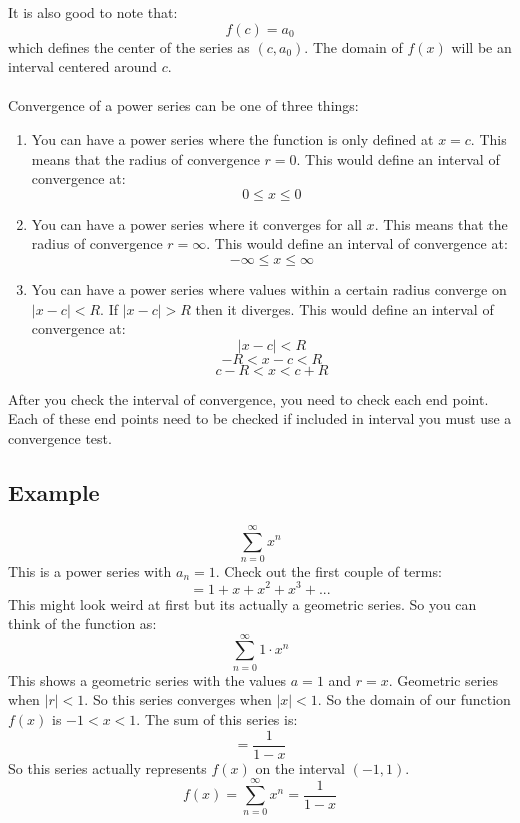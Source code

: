 \documentclass{article}
\begin{document}
    It is also good to note that:
    \[f(c) = a_0\]
    which defines the center of the series as \((c, a_0)\).
    The domain of \(f(x)\) will be an interval centered around \(c\).\\
    \\
    Convergence of a power series can be one of three things:
    \begin{enumerate}
        \item You can have a power series where the function is only defined at \(x = c\).
        This means that the radius of convergence \(r = 0\).
        This would define an interval of convergence at:
        \[0 \leq x \leq 0\]
        \item You can have a power series where it converges for all \(x\).
        This means that the radius of convergence \(r = \infty\).
        This would define an interval of convergence at:
        \[- \infty \leq x \leq \infty\]
        \item You can have a power series where values within a certain radius converge on
        \(|x-c| < R\).
        If \(|x-c| > R\) then it diverges.
        This would define an interval of convergence at:
        \[|x-c| < R\]
        \[-R < x - c < R\]
        \[c - R < x < c + R\]
    \end{enumerate}
    After you check the interval of convergence, you need to check each end point.
    Each of these end points need to be checked if included in interval you must use a convergence test.
    
    \subsection{Example}
        \[\sum_{n=0}^{\infty} x^n \]
        This is a power series with \(a_n = 1\).
        Check out the first couple of terms:
        \[= 1 + x + x^2 + x^3 + ...\]
        This might look weird at first but its actually a geometric series.
        So you can think of the function as:
        \[\sum_{n=0}^{\infty} 1 \cdot x^n\]
        This shows a geometric series with the values \(a = 1\) and \(r = x\).
        Geometric series when \(|r| < 1\).
        So this series converges when \(|x| < 1\).
        So the domain of our function \(f(x)\) is \(-1 < x < 1\).
        The sum of this series is:
        \[= \frac{1}{1-x}\]
        So this series actually represents \(f(x)\) on the interval \((-1, 1)\).
        \[f(x) = \sum_{n=0}^{\infty} x^n = \frac{1}{1-x}\] 
        
\end{document}
